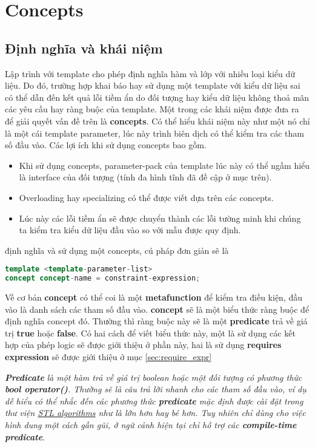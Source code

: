 \section{Concepts}
\subsection{Định nghĩa và khái niệm}
Lập trình với template cho phép định nghĩa hàm và lớp với nhiều loại kiểu dữ liệu. Do đó, trường hợp khai báo hay sử dụng một template với kiểu dữ liệu sai có thể dẫn đến kết quả lỗi tiềm ẩn do đối tượng hay kiểu dữ liệu không thoả mãn các yêu cầu hay ràng buộc của template. Một trong các khái niệm được đưa ra để giải quyết vấn đề trên là \textbf{concepts}. Có thể hiểu khái niệm này như một nó chỉ là một cái template parameter, lúc này trình biên dịch có thể kiểm tra các tham số đầu vào. Các lợi ích khi sử dụng concepts bao gồm.
\begin{itemize}
    \item Khi sử dụng concepts, parameter-pack của template lúc này có thể ngầm hiểu là interface của đối tượng (tính đa hình tĩnh đã đề cập ở mục trên).
    \item Overloading hay specializing có thể được viết dựa trên các concepts.
    \item Lúc này các lỗi tiềm ẩn sẽ được chuyển thành các lỗi tường minh khi chúng ta kiểm tra kiểu dữ liệu đầu vào so với mẫu được quy định.
\end{itemize}

 định nghĩa và sử dụng một concepts, cú pháp đơn giản sẽ là 


\begin{lstlisting}[caption={Cú pháp concept \cite{concept-def}},label={code:syntax},language=C++]
template <template-parameter-list>
concept concept-name = constraint-expression;
\end{lstlisting}

Về cơ bản \textbf{concept}\cite{concept-cpp} có thể coi là một \textbf{metafunction} để kiểm tra điều kiện, đầu vào là danh sách các tham số đầu vào. \textbf{concept} sẽ là một biểu thức ràng buộc để định nghĩa concept đó. Thường thì ràng buộc này sẽ là một \textbf{predicate} trả về giá trị \textbf{true} hoặc \textbf{false}. Có hai cách để viết biểu thức này, một là sử dụng các kết hợp của phép logic sẽ được giới thiệu ở phần này, hai là sử dụng \textbf{requires expression} sẽ được giới thiệu ở mục \ref{sec:require_expr}

\textit{\textbf{Predicate}}\cite{predicate} \textit{là một hàm trả về giá trị boolean hoặc một đối tượng có phương thức \textbf{bool operator()}. Thường sẽ là câu trả lời nhanh cho các tham số đầu vào, ví dụ dễ hiểu có thể nhắc đến các phương thức \textbf{predicate} mặc định được cài đặt trong thư viện \href{http://en.cppreference.com/w/cpp/algorithm}{STL algorithms} như là lớn hơn hay bé hơn. Tuy nhiên chỉ dùng cho việc hình dung một cách gần gũi, ở ngữ cảnh hiện tại chỉ hỗ trợ các \textbf{compile-time predicate}}.

